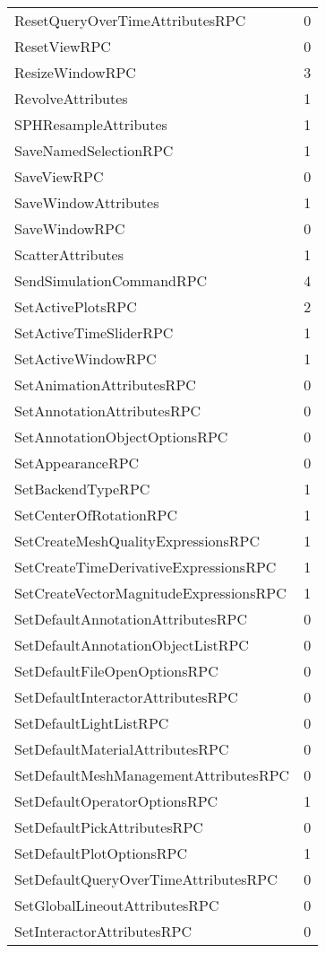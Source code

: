 \documentclass[10pt,a4paper]{report}
\begin{document}
\begin{longtable}{ll}
ResetQueryOverTimeAttributesRPC & 0 \\
ResetViewRPC & 0 \\
ResizeWindowRPC & 3 \\
RevolveAttributes & 1 \\
SPHResampleAttributes & 1 \\
SaveNamedSelectionRPC & 1 \\
SaveViewRPC & 0 \\
SaveWindowAttributes & 1 \\
SaveWindowRPC & 0 \\
ScatterAttributes & 1 \\
SendSimulationCommandRPC & 4 \\
SetActivePlotsRPC & 2 \\
SetActiveTimeSliderRPC & 1 \\
SetActiveWindowRPC & 1 \\
SetAnimationAttributesRPC & 0 \\
SetAnnotationAttributesRPC & 0 \\
SetAnnotationObjectOptionsRPC & 0 \\
SetAppearanceRPC & 0 \\
SetBackendTypeRPC & 1 \\
SetCenterOfRotationRPC & 1 \\
SetCreateMeshQualityExpressionsRPC & 1 \\
SetCreateTimeDerivativeExpressionsRPC & 1 \\
SetCreateVectorMagnitudeExpressionsRPC & 1 \\
SetDefaultAnnotationAttributesRPC & 0 \\
SetDefaultAnnotationObjectListRPC & 0 \\
SetDefaultFileOpenOptionsRPC & 0 \\
SetDefaultInteractorAttributesRPC & 0 \\
SetDefaultLightListRPC & 0 \\
SetDefaultMaterialAttributesRPC & 0 \\
SetDefaultMeshManagementAttributesRPC & 0 \\
SetDefaultOperatorOptionsRPC & 1 \\
SetDefaultPickAttributesRPC & 0 \\
SetDefaultPlotOptionsRPC & 1 \\
SetDefaultQueryOverTimeAttributesRPC & 0 \\
SetGlobalLineoutAttributesRPC & 0 \\
SetInteractorAttributesRPC & 0 \\

\end{longtable}
\end{document}
